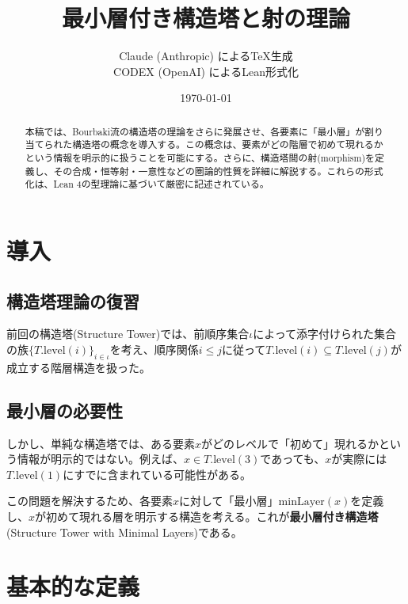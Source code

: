 \documentclass[a4paper,12pt]{article}
\title{最小層付き構造塔と射の理論}
\author{Claude (Anthropic) によるTeX生成\\CODEX (OpenAI) によるLean形式化}
\date{\today}
\theoremstyle{definition}
\begin{document}
\maketitle

\begin{abstract}
本稿では、Bourbaki流の構造塔の理論をさらに発展させ、各要素に「最小層」が割り当てられた構造塔の概念を導入する。この概念は、要素がどの階層で初めて現れるかという情報を明示的に扱うことを可能にする。さらに、構造塔間の射(morphism)を定義し、その合成・恒等射・一意性などの圏論的性質を詳細に解説する。これらの形式化は、Lean 4の型理論に基づいて厳密に記述されている。
\end{abstract}

\tableofcontents

\section{導入}

\subsection{構造塔理論の復習}

前回の構造塔(Structure Tower)では、前順序集合$\iota$によって添字付けられた集合の族$\{T.\text{level}(i)\}_{i \in \iota}$を考え、順序関係$i \leq j$に従って$T.\text{level}(i) \subseteq T.\text{level}(j)$が成立する階層構造を扱った。

\subsection{最小層の必要性}

しかし、単純な構造塔では、ある要素$x$がどのレベルで「初めて」現れるかという情報が明示的ではない。例えば、$x \in T.\text{level}(3)$であっても、$x$が実際には$T.\text{level}(1)$にすでに含まれている可能性がある。

この問題を解決するため、各要素$x$に対して「最小層」$\text{minLayer}(x)$を定義し、$x$が初めて現れる層を明示する構造を考える。これが\textbf{最小層付き構造塔}(Structure Tower with Minimal Layers)である。

\section{基本的な定義}
\end{document}
